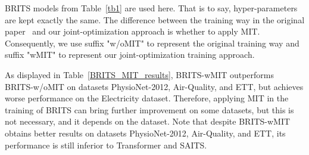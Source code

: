 \documentclass{article}
\begin{document}
BRITS models from Table~\ref{tb1} are used here. That is to say, hyper-parameters are kept exactly the same. The difference between the training way in the original paper~\cite{Cao2018BRITS} and our joint-optimization approach is whether to apply MIT. Consequently, we use suffix "w/oMIT" to represent the original training way and suffix "wMIT" to represent our joint-optimization training approach.

As displayed in Table~\ref{BRITS_MIT_results}, BRITS-wMIT outperforms BRITS-w/oMIT on datasets PhysioNet-2012, Air-Quality, and ETT, but achieves worse performance on the Electricity dataset. Therefore, applying MIT in the training of BRITS can bring further improvement on some datasets, but this is not necessary, and it depends on the dataset. Note that despite BRITS-wMIT obtains better results on datasets PhysioNet-2012, Air-Quality, and ETT, its performance is still inferior to Transformer and SAITS.	
\end{document}
